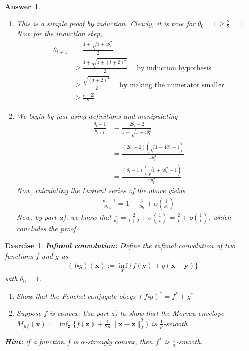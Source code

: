 \documentclass[12pt]{article}
\theoremstyle{colon}
\newtheorem{exercise}{Exercise}
\newtheorem*{answer}{Answer}
\begin{document}
\begin{answer}
	\
	\begin{enumerate}[label=\alph*)]
		\item This is a simple proof by induction. Clearly, it is true for $\theta_0 = 1 \geq \frac{2}{2} = 1$. Now for the induction step,
			\begin{align*}
				\theta_{t+1} &= \frac{1 + \sqrt{1 + 4\theta_t^2}}{2} \\
				&\geq \frac{1 + \sqrt{1 + (t+2)^2}}{2} \quad \text{ by induction hypothesis} \\
				&\geq \frac{\sqrt{(t+2)^2}}{2} \quad \text{ by making the numerator smaller} \\
				&\geq \frac{t+2}{2}
			\end{align*}

		\item We begin by just using definitions and manipulating
			\begin{align*}
				\frac{\theta_t - 1}{\theta_{t+1}} &= \frac{2 \theta_t - 2}{1 + \sqrt{1 + 4 \theta_t^2}} \\
				&= \frac{(2 \theta_t - 2)(\sqrt{1 + 4 \theta_t^2} - 1)}{4 \theta_t^2} \\
				&= \frac{(\theta_t - 1)(\sqrt{1 + 4 \theta_t^2} - 1)}{2 \theta_t^2}
			\end{align*}
			Now, calculating the Laurent series of the above yields
			\begin{gather*}
				\frac{\theta_t - 1}{\theta_{t+1}} = 1 - \frac{3}{2 \theta_t} + o \left( \frac{1}{\theta_t} \right)
			\end{gather*}
			Now, by part a), we know that $\frac{1}{\theta_t} = \frac{2}{t+2} + o \left( \frac{1}{t} \right) = \frac{2}{t} + o \left( \frac{1}{t} \right)$, which concludes the proof.
	\end{enumerate}
\end{answer}

\clearpage

\begin{exercise}
	\textbf{Infimal convolution:} Define the infimal convolution of two functions $f$ and $g$ as
	\begin{gather*}
		(f \square g)(\bm{x}) := \inf_{\bm{y}} \{ f(\bm{y}) + g(\bm{x} - \bm{y}) \}
	\end{gather*}
	with $\theta_0 = 1$.
	\begin{enumerate}[label=\alph*)]
		\item Show that the Fenchel conjugate obeys $(f \square g)^* = f^* + g^*$
		\item Suppose $f$ is convex. Use part a) to show that the Moreau envelope $M_{\mu f}(\bm{x}) := \inf_{\bm{z}} \{ f(\bm{z}) + \frac{1}{2\mu} \lVert \bm{x} - \bm{z} \rVert_2^2 \}$ is $\frac{1}{\mu}$-smooth.
	\end{enumerate}
	\textbf{Hint: } if a function $f$ is $\alpha$-strongly convex, then $f^*$ is $\frac{1}{\alpha}$-smooth.
\end{exercise}
\end{document}
